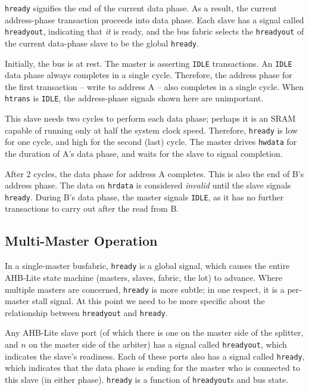 \documentclass[notitlepage]{article}
\begin{document}
\texttt{hready} signifies the end of the current data phase. As a result, the current address-phase transaction proceeds into data phase. Each slave has a signal called \texttt{hreadyout}, indicating that \textit{it} is ready, and the bus fabric selects the \texttt{hreadyout} of the current data-phase slave to be the global \texttt{hready}.

Initially, the bus is at rest. The master is asserting \texttt{IDLE} transactions. An \texttt{IDLE} data phase always completes in a single cycle. Therefore, the address phase for the first transaction -- write to address A -- also completes in a single cycle. When \texttt{htrans} is \texttt{IDLE}, the address-phase signals shown here are unimportant.

This slave needs two cycles to perform each data phase; perhaps it is an SRAM capable of running only at half the system clock speed. Therefore, \texttt{hready} is low for one cycle, and high for the second (last) cycle. The master drives \texttt{hwdata} for the duration of A's data phase, and waits for the slave to signal completion.

After 2 cycles, the data phase for address A completes. This is also the end of B's address phase. The data on \texttt{hrdata} is considered \textit{invalid} until the slave signals \texttt{hready}. During B's data phase, the master signals \texttt{IDLE}, as it has no further transactions to carry out after the read from B.

\subsection{Multi-Master Operation}

In a single-master busfabric, \texttt{hready} is a global signal, which causes the entire AHB-Lite state machine (masters, slaves, fabric, the lot) to advance. Where multiple masters are concerned, \texttt{hready} is more subtle; in one respect, it is a per-master stall signal. At this point we need to be more specific about the relationship between \texttt{hreadyout} and \texttt{hready}.

Any AHB-Lite slave port (of which there is one on the master side of the splitter, and $n$ on the master side of the arbiter) has a signal called \texttt{hreadyout}, which indicates the slave's readiness. Each of these ports also has a signal called \texttt{hready}, which indicates that the data phase is ending for the master who is connected to this slave (in either phase). \texttt{hready} is a function of \texttt{hreadyout}s and bus state.
\end{document}
